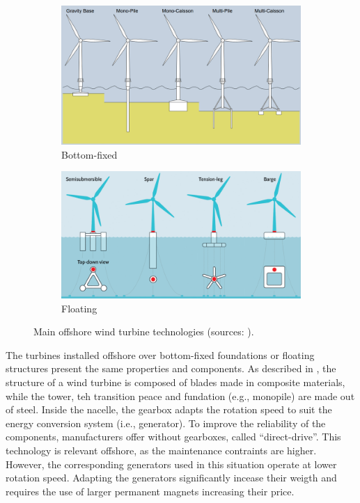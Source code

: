 \begin{figure}
    \begin{subfigure}[b]{0.48\textwidth}
        \centering
        \includegraphics[width=\linewidth]{./part1/figures/bottom_fixed_techno.png}
        \caption{Bottom-fixed}
        \label{fig:FOWT_bottomfixed}
    \end{subfigure}
    \begin{subfigure}[b]{0.48\textwidth}
        \centering
        \includegraphics[width=\linewidth]{./part1/figures/Floating-wind-platform-categories.png}
        \caption{Floating}
        \label{fig:FOWT_floating}
    \end{subfigure}
    \caption{Main offshore wind turbine technologies (sources: \citet{ahmed_2015_bottomfixed_image,mei_2021_FOWT_illustration}).}
\end{figure}



The turbines installed offshore over bottom-fixed foundations or floating structures present the same properties and components. 
As described in , the structure of a wind turbine is composed of blades made in composite materials, while the tower, teh transition peace and fundation (e.g., monopile) are made out of steel. 
Inside the nacelle, the gearbox adapts the rotation speed to suit the energy conversion system (i.e., generator). 
To improve the reliability of the components, manufacturers offer without gearboxes, called ``direct-drive''. 
This technology is relevant offshore, as the maintenance contraints are higher. 
However, the corresponding generators used in this situation operate at lower rotation speed. 
Adapting the generators significantly incease their weigth and requires the use of larger permanent magnets increasing their price.   

